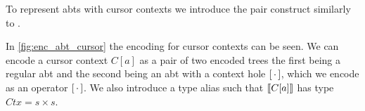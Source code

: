 \documentclass[sigplan]{acmart}
\newcommand{\abt}{\textsf{abt}\xspace}
\begin{document}
To represent {\abt}s with cursor contexts we introduce the pair construct similarly to \cite{types_programming_languages}.


In \cref{fig:enc_abt_cursor} the encoding for cursor contexts can be seen. We can encode a cursor context $C[a]$ as a pair of two encoded trees the first being a regular \abt and the second being an \abt with a context hole $[ \, \cdot \, ]$, which we encode as an operator $[ \, \cdot \, ]$. We also introduce a type alias such that $\llbracket C[a] \rrbracket$ has type $Ctx = s \times s$.

\end{document}
